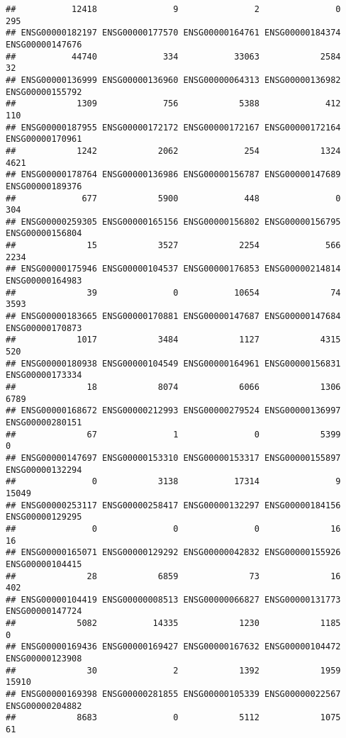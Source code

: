 \documentclass[
]{article}
\begin{document}
\begin{verbatim}
##           12418               9               2               0             295 
## ENSG00000182197 ENSG00000177570 ENSG00000164761 ENSG00000184374 ENSG00000147676 
##           44740             334           33063            2584              32 
## ENSG00000136999 ENSG00000136960 ENSG00000064313 ENSG00000136982 ENSG00000155792 
##            1309             756            5388             412             110 
## ENSG00000187955 ENSG00000172172 ENSG00000172167 ENSG00000172164 ENSG00000170961 
##            1242            2062             254            1324            4621 
## ENSG00000178764 ENSG00000136986 ENSG00000156787 ENSG00000147689 ENSG00000189376 
##             677            5900             448               0             304 
## ENSG00000259305 ENSG00000165156 ENSG00000156802 ENSG00000156795 ENSG00000156804 
##              15            3527            2254             566            2234 
## ENSG00000175946 ENSG00000104537 ENSG00000176853 ENSG00000214814 ENSG00000164983 
##              39               0           10654              74            3593 
## ENSG00000183665 ENSG00000170881 ENSG00000147687 ENSG00000147684 ENSG00000170873 
##            1017            3484            1127            4315             520 
## ENSG00000180938 ENSG00000104549 ENSG00000164961 ENSG00000156831 ENSG00000173334 
##              18            8074            6066            1306            6789 
## ENSG00000168672 ENSG00000212993 ENSG00000279524 ENSG00000136997 ENSG00000280151 
##              67               1               0            5399               0 
## ENSG00000147697 ENSG00000153310 ENSG00000153317 ENSG00000155897 ENSG00000132294 
##               0            3138           17314               9           15049 
## ENSG00000253117 ENSG00000258417 ENSG00000132297 ENSG00000184156 ENSG00000129295 
##               0               0               0              16              16 
## ENSG00000165071 ENSG00000129292 ENSG00000042832 ENSG00000155926 ENSG00000104415 
##              28            6859              73              16             402 
## ENSG00000104419 ENSG00000008513 ENSG00000066827 ENSG00000131773 ENSG00000147724 
##            5082           14335            1230            1185               0 
## ENSG00000169436 ENSG00000169427 ENSG00000167632 ENSG00000104472 ENSG00000123908 
##              30               2            1392            1959           15910 
## ENSG00000169398 ENSG00000281855 ENSG00000105339 ENSG00000022567 ENSG00000204882 
##            8683               0            5112            1075              61 

\end{verbatim}
\end{document}
